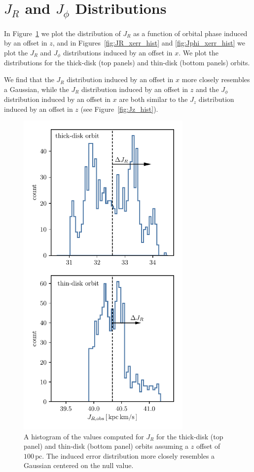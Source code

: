 \documentclass[twocolumn]{aastex62}
\newcommand{\pc}{\text{pc}}
\begin{document}
\section{$J_R$ and $J_{\phi}$ Distributions} \label{app:hist}

In Figure~\ref{fig:JR_zerr_hist} we plot the distribution of $J_R$ as a function of orbital phase induced by an offset in $z$, and in Figures~\ref{fig:JR_xerr_hist} and
\ref{fig:Jphi_xerr_hist} we plot the $J_R$ and $J_{\phi}$
distributions induced by an offset in $x$. We plot the distributions for the
thick-disk (top panels) and thin-disk (bottom panels) orbits.

We find that the $J_R$ distribution induced by an offset in $x$ more
closely resembles a Gaussian, while the $J_R$ distribution induced by
an offset in $z$ and the $J_{\phi}$ distribution induced by an offset
in $x$ are both similar to the $J_z$ distribution induced by an
offset in $z$ (see Figure~\ref{fig:Jz_hist}).

\begin{figure}
\begin{center}
\includegraphics[width=3.35224200913in]{fig/schmactions_JR_zerr_hist.pdf}
\end{center}
\caption{A histogram of the values computed for $J_R$ for the thick-disk (top
panel) and thin-disk (bottom panel) orbits assuming a $z$ offset of
$100\,\pc$. The induced error distribution more closely resembles a Gaussian
centered on the null value.}
\label{fig:JR_zerr_hist}
\end{figure}
\end{document}
